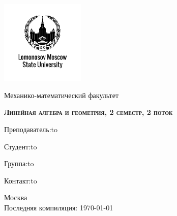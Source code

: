 \begin{titlepage}
  \newpage
  \begin{center}
  \includegraphics[width=4cm]{image/image.png}
  \end{center}
  \vspace{4em}
  
  \begin{center}
  \Large Механико-математический факультет  
  \end{center}
  \vspace{2em}
  
  \begin{center}
  \large{\textsc{\textbf{Линейная алгебра и геометрия, 2 семестр, 2 поток}}}
  \end{center}
  \vspace{6em}
  
  \newbox{\lbox}
  \newlength{\maxl}
  \setlength{\maxl}{\wd\lbox}
  \hfill\parbox{11cm}
  {
  Преподаватель:\hfill\hbox to\vspace{0.5cm}
  
  Студент:\hfill\hbox to\vspace{0.5cm}

  Группа:\hfill\hbox to\vspace{0.5cm}
  
  Контакт:\hfill\hbox to\vspace{0.5cm}
  }

  \vspace{\fill}
  \begin{center}
  Москва \\Последняя компиляция: \today
  \end{center}
  
\end{titlepage}